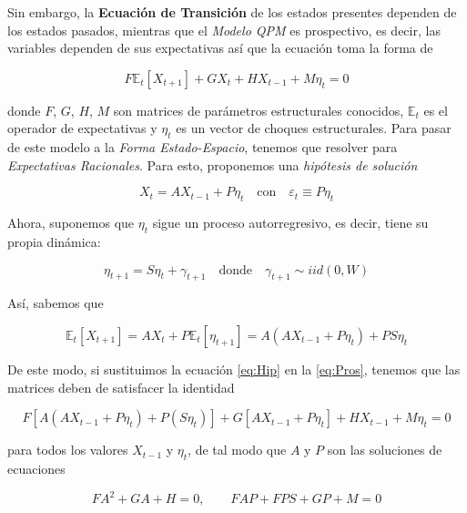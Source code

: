 \documentclass[
]{book}
\begin{document}
Sin embargo, la \textbf{Ecuación de Transición} de los estados presentes dependen de los estados pasados, mientras que el \emph{Modelo QPM} es prospectivo, es decir, las variables dependen de sus expectativas así que la ecuación toma la forma de

\begin{equation}
F \mathbb{E}_t[X_{t+1}] + G X_t + H X_{t-1} + M \eta_t = 0 
\label{eq:Pros}
\end{equation}

donde \(F\), \(G\), \(H\), \(M\) son matrices de parámetros estructurales conocidos, \(\mathbb{E}_t\) es el operador de expectativas y \(\eta_t\) es un vector de choques estructurales. Para pasar de este modelo a la \emph{Forma Estado-Espacio}, tenemos que resolver para \emph{Expectativas Racionales}. Para esto, proponemos una \emph{hipótesis de solución}

\begin{equation}
X_t = A X_{t-1} + P \eta_t
\quad \text{con} \quad
\varepsilon_t \equiv P \eta_t 
\label{eq:Hip}
\end{equation}

Ahora, suponemos que \(\eta_t\) sigue un proceso autorregresivo, es decir, tiene su propia dinámica:

\begin{equation}
\eta_{t+1} = S \eta_t + \gamma_{t+1} 
\quad \text{donde} \quad 
\gamma_{t+1} \sim iid(0,W)
\end{equation}

Así, sabemos que

\begin{equation}
\mathbb{E}_t[X_{t+1}] = A X_t + P \mathbb{E}_t[\eta_{t+1}] = A (A X_{t-1} + P \eta_t) + P S \eta_t
\end{equation}

De este modo, si sustituimos la ecuación \eqref{eq:Hip} en la \eqref{eq:Pros}, tenemos que las matrices deben de satisfacer la identidad

\begin{equation}
F [A (A X_{t-1} + P \eta_t) + P (S \eta_t)] + G [A X_{t-1} + P \eta_t] + H X_{t-1} + M \eta_t = 0
\label{eq:Iden}
\end{equation}

para todos los valores \(X_{t-1}\) y \(\eta_t\), de tal modo que \(A\) y \(P\) son las soluciones de ecuaciones

\begin{equation}
F A^2 + G A + H = 0, 
\quad \quad
F A P + F P S + G P + M = 0
\label{eq:Sol}
\end{equation}
\end{document}
